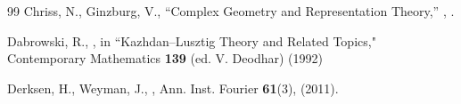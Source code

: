 \documentclass[12pt,reqno]{amsart}
\theoremstyle{definition}
\begin{document}
\begin{thebibliography}{99}
	Chriss, N., Ginzburg, V.,
	\newblock``Complex Geometry and Representation Theory,''
	,
	.
	
%	
	
	
	Dabrowski, R., 
	, in ``Kazhdan--Lusztig Theory and Related Topics,"
	\newblock Contemporary Mathematics {\bf 139} (ed. V. Deodhar) (1992)
	
	
	
	Derksen, H., Weyman, J., 
	,
	\newblock Ann. Inst. Fourier {\bf 61}(3), (2011). 
	
	
	
	
	
	

\end{thebibliography}
\end{document}
